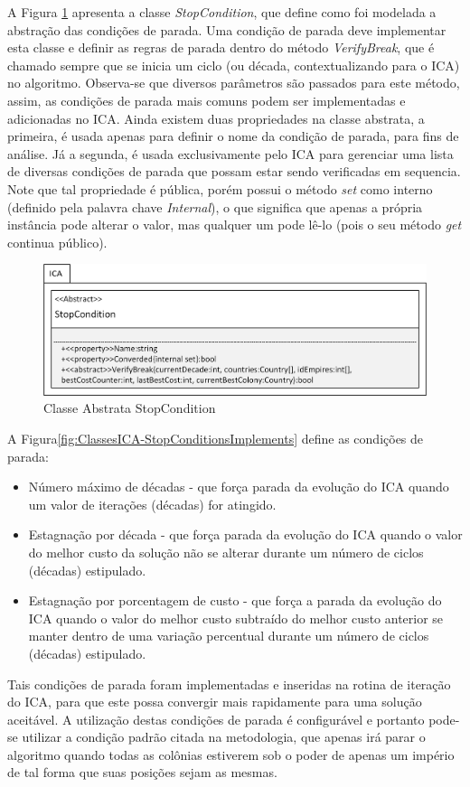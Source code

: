 A Figura \ref{fig:ClassesICA-StopCondition} apresenta a classe \emph{StopCondition}, que define como foi modelada a abstração das condições de parada. Uma condição de parada deve implementar esta classe e definir as regras de parada dentro do método \emph{VerifyBreak}, que é chamado sempre que se inicia um ciclo (ou década, contextualizando para o ICA) no algoritmo. Observa-se que diversos parâmetros são passados para este método, assim, as condições de parada mais comuns podem ser implementadas e adicionadas no ICA. Ainda existem duas propriedades na classe abstrata, a primeira, é usada apenas para definir o nome da condição de parada, para fins de análise. Já a segunda, é usada exclusivamente pelo ICA para gerenciar uma lista de diversas condições de parada que possam estar sendo verificadas em sequencia. Note que tal propriedade é pública, porém possui o método \emph{set} como interno (definido pela palavra chave \emph{Internal}), o que significa que apenas a própria instância pode alterar o valor, mas qualquer um pode lê-lo (pois o seu método \emph{get} continua público).
 
\begin{figure}[h]
	\centering	
	\includegraphics[scale=1]{Figuras/ClassesICA-StopCondition.png}
	\caption{Classe Abstrata StopCondition}
	\label{fig:ClassesICA-StopCondition}
	\end{figure}

A Figura\ref{fig:ClassesICA-StopConditionsImplements} define as condições de parada:
\begin{itemize}
\item Número máximo de décadas - que força parada da evolução do ICA quando um valor de iterações (décadas) for atingido. 
\item Estagnação por década - que força parada da evolução do ICA quando o valor do melhor custo da solução não se alterar durante um número de ciclos (décadas) estipulado.
\item Estagnação por porcentagem de custo - que força a parada da evolução do ICA quando o valor do melhor custo subtraído do melhor custo anterior  se manter dentro de uma variação percentual durante um número de ciclos (décadas) estipulado.
\end{itemize}
Tais condições de parada foram implementadas e inseridas na rotina de iteração do ICA, para que este possa convergir mais rapidamente para uma solução aceitável. A utilização destas condições de parada é configurável e portanto pode-se utilizar a condição padrão citada na metodologia, que apenas irá parar o algoritmo quando todas as colônias estiverem sob o poder de apenas um império de tal forma que suas posições sejam as mesmas.

